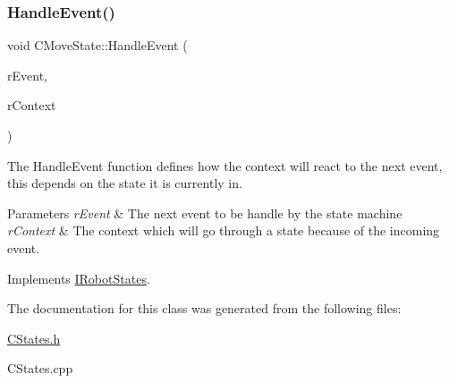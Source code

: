 \subsubsection{\texorpdfstring{Handle\+Event()}{HandleEvent()}}
{\footnotesize\ttfamily void C\+Move\+State\+::\+Handle\+Event (\begin{DoxyParamCaption}\item[{\hyperlink{classCEvent}{C\+Event} \&}]{r\+Event,  }\item[{\hyperlink{classCRobotContext}{C\+Robot\+Context} \&}]{r\+Context }\end{DoxyParamCaption})\hspace{0.3cm}{\ttfamily [virtual]}}



The Handle\+Event function defines how the context will react to the next event, this depends on the state it is currently in. 


\begin{DoxyParams}{Parameters}
{\em r\+Event} & The next event to be handle by the state machine \\
\hline
{\em r\+Context} & The context which will go through a state because of the incoming event. \\
\hline
\end{DoxyParams}


Implements \hyperlink{classIRobotStates_a0b6c28a3deed04f93371a9395022f1ed}{I\+Robot\+States}.



The documentation for this class was generated from the following files\+:\begin{DoxyCompactItemize}
\item 
\hyperlink{CStates_8h}{C\+States.\+h}\item 
C\+States.\+cpp\end{DoxyCompactItemize}
